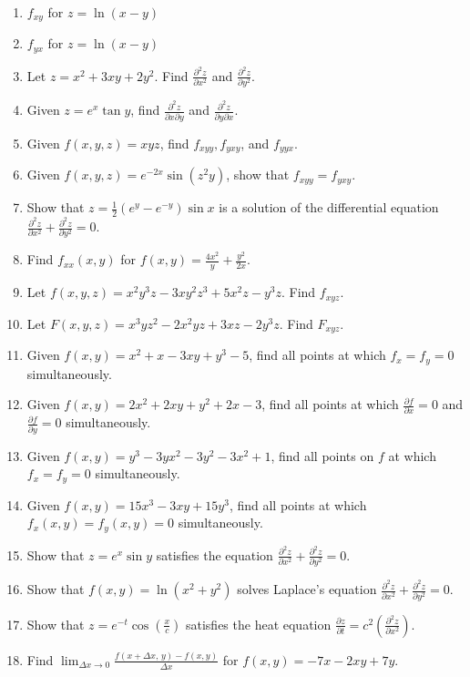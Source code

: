 \documentclass{exercises}
\begin{document}
\begin{enumerate}[resume]
\item $f_{xy}$ for $z=\ln(x-y)$
\item $f_{yx}$ for $z=\ln(x-y)$
\item Let $z=x^{2}+3xy+2y^{2}$. Find $\frac{\partial^{2}z}{\partial x^{2}}$ and $\frac{\partial^{2}z}{\partial y^{2}}$.
\item Given $z=e^{x}\tan y$, find $\frac{\partial^{2}z}{\partial x\partial y}$ and $\frac{\partial^{2}z}{\partial y\partial x}$.
\item Given $f(x,y,z)=xyz$, find $f_{xyy},f_{yxy}$, and $f_{yyx}$.
\item Given $f(x,y,z)=e^{-2x}\sin(z^{2}y)$, show that $f_{xyy}=f_{yxy}$.
\item Show that $z=\frac{1}{2}(e^{y}-e^{-y})\sin x$ is a solution of the differential equation $\frac{\partial^{2}z}{\partial x^{2}}+\frac{\partial^{2}z}{\partial y^{2}}=0$.
\item Find $f_{xx}(x,y)$ for $f(x,y)=\frac{4x^{2}}{y}+\frac{y^{2}}{2x}$.
\item Let $f(x,y,z)=x^{2}y^{3}z-3xy^{2}z^{3}+5x^{2}z-y^{3}z$. Find $f_{xyz}$.
\item Let $F(x,y,z)=x^{3}yz^{2}-2x^{2}yz+3xz-2y^{3}z$. Find $F_{xyz}$.
\item Given $f(x,y)=x^{2}+x-3xy+y^{3}-5$, find all points at which $f_{x}=f_{y}=0$ simultaneously.
\item Given $f(x,y)=2x^{2}+2xy+y^{2}+2x-3$, find all points at which $\frac{\partial f}{\partial x}=0$ and $\frac{\partial f}{\partial y}=0$ simultaneously.
\item Given $f(x,y)=y^{3}-3yx^{2}-3y^{2}-3x^{2}+1$, find all points on $f$ at which $f_{x}=f_{y}=0$ simultaneously.
\item Given $f(x,y)=15x^{3}-3xy+15y^{3}$, find all points at which $f_{x}(x,y)=f_{y}(x,y)=0$ simultaneously.
\item Show that $z=e^{x}\sin y$ satisfies the equation $\frac{\partial^{2}z}{\partial x^{2}}+\frac{\partial^{2}z}{\partial y^{2}}=0$.
\item Show that $f(x,y)=\ln(x^{2}+y^{2})$ solves Laplace's equation $\frac{\partial^{2}z}{\partial x^{2}}+\frac{\partial^{2}z}{\partial y^{2}}=0$.
\item Show that $z=e^{-t}\cos(\frac{x}{c})$ satisfies the heat equation $\frac{\partial z}{\partial t}=c^{2}\left( \frac{\partial^{2}z}{\partial x^{2}} \right)$.
\item Find $\lim_{\Delta x\to0}\frac{f(x+\Delta x,\,y)-f(x,y)}{\Delta x}$ for $f(x,y)=-7x-2xy+7y$.

\end{enumerate}
\end{document}
